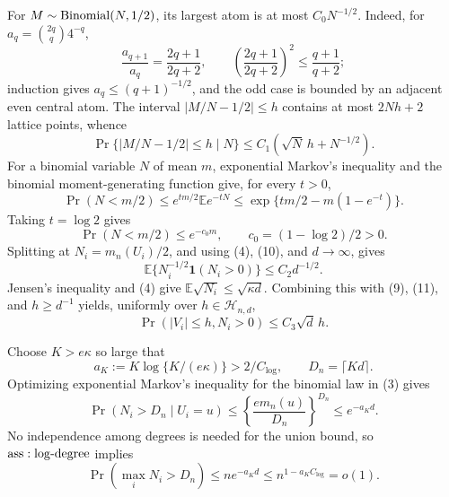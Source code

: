 For \(M\sim{\rm Binomial}(N,1/2)\), its largest atom is at most \(C_0N^{-1/2}\).  Indeed, for \(a_q={2q\choose q}4^{-q}\),
\[
 \frac{a_{q+1}}{a_q}=\frac{2q+1}{2q+2},
 \qquad
 \left(\frac{2q+1}{2q+2}\right)^2\leq\frac{q+1}{q+2};
\]
induction gives \(a_q\leq(q+1)^{-1/2}\), and the odd case is bounded by an adjacent even central atom.  The interval \(|M/N-1/2|\leq h\) contains at most \(2Nh+2\) lattice points, whence
\[
 \Pr\{|M/N-1/2|\leq h\mid N\}
 \leq C_1(\sqrt N\,h+N^{-1/2}).
\tag{9}
\]
For a binomial variable \(N\) of mean \(m\), exponential Markov's inequality and the binomial moment-generating function give, for every \(t>0\),
\[
 \Pr(N<m/2)
 \leq e^{tm/2}\mathbb E e^{-tN}
 \leq\exp\{tm/2-m(1-e^{-t})\}.
\]
Taking \(t=\log2\) gives
\[
 \Pr(N<m/2)\leq e^{-c_0m},
 \qquad c_0=(1-\log2)/2>0.
\tag{10}
\]
Splitting at \(N_i=m_n(U_i)/2\), and using (4), (10), and \(d\to\infty\), gives
\[
 \mathbb E\{N_i^{-1/2}\mathbf1(N_i>0)\}
 \leq C_2d^{-1/2}.
\tag{11}
\]
Jensen's inequality and (4) give \(\mathbb E\sqrt{N_i}\leq\sqrt{\kappa d}\).  Combining this with (9), (11), and \(h\geq d^{-1}\) yields, uniformly over \(h\in\mathcal H_{n,d}\),
\[
 \Pr(|V_i|\leq h,N_i>0)\leq C_3\sqrt d\,h.
\tag{12}
\]

Choose \(K>e\kappa\) so large that
\[
 a_K:=K\log\{K/(e\kappa)\}>2/C_{\log},
 \qquad D_n=\lceil Kd\rceil.
\tag{13}
\]
Optimizing exponential Markov's inequality for the binomial law in (3) gives
\[
 \Pr(N_i>D_n\mid U_i=u)
 \leq\left\{\frac{em_n(u)}{D_n}\right\}^{D_n}
 \leq e^{-a_Kd}.
\]
No independence among degrees is needed for the union bound, so \({\rm ass:log\text{-}degree}\) implies
\[
 \Pr\left(\max_iN_i>D_n\right)
 \leq ne^{-a_Kd}
 \leq n^{1-a_KC_{\log}}=o(1).
\tag{14}
\]

